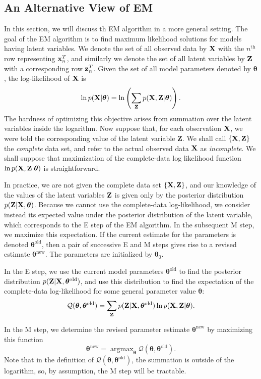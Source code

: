 \documentclass[../book-template.tex]{subfiles}
\begin{document}
\subsection{An Alternative View of EM}\label{sec_4_em_km_compare}
In this section, we will discuss th EM algorithm in a more general setting. The goal of the EM algorithm is to find maximum likelihood solutions for models having latent variables. We denote the set of all observed data by ${\bf X}$ with the $n^{\text{th}}$ row representing ${\bf x}_n^T$, and similarly we denote the set of all latent variables by ${\bf Z}$ with a corresponding row ${\bf z}_n^T$. Given the set of all model parameters denoted by $\bm{\theta}$, the log-likelihood of ${\bf X}$ is
\begin{equation*}
	\ln p({\bf X}|\bm{\theta}) = \ln \left(\sum_{\bf Z} p({\bf X,Z}|\bm{\theta}) \right).
\end{equation*}
The hardness of optimizing this objective arises from summation over the latent variables inside the logarithm. Now suppose that, for each observation ${\bf X}$, we were told the corresponding value of the latent variable {\bf Z}. We shall call $\{{\bf X, Z}\}$ the \emph{complete} data set, and refer to the actual observed data ${\bf X}$ as \emph{incomplete}. We shall suppose that maximization of the complete-data log likelihood function $\ln p({\bf X,Z}|\bm{\theta})$ is straightforward.
\par In practice, we are not given the complete data set $\{{\bf X, Z}\}$, and our knowledge of the values of the latent variables ${\bf Z}$ is given only by the posterior distribution $p({\bf Z}|{\bf X},\bm{\theta})$. Because we cannot use the complete-data log-likelihood, we consider instead its expected value under the posterior distribution of the latent variable, which corresponds to the E step of the EM algorithm. In the subsequent M step, we maximize this expectation. If the current estimate for the parameters is denoted $\bm{\theta}^{\text{old}}$, then a pair of successive E and M steps gives rise to a revised estimate $\bm{\theta}^{\text{new}}$. The parameters are initialized by $\bm{\theta}_0$.
\par In the E step, we use the current model parameters $\bm{\theta}^{\text{old}}$ to find the posterior distribution $p({\bf Z}|{\bf X},\bm{\theta}^{\text{old}})$, and use this distribution to find the expectation of the complete-data log-likelihood for some general parameter value $\bm{\theta}$:
\begin{equation*}
	\mathcal{Q}(\bm{\theta}, \bm{\theta}^{\text{old}}) = \sum_{\bf Z} p({\bf Z}|{\bf X},\bm{\theta}^{\text{old}}) \ln p({\bf X, Z}|\bm{\theta}).
\end{equation*}
\par In the M step, we determine the revised parameter estimate $\bm{\theta}^{\text{new}}$ by maximizing this function
\begin{equation*}
	 \bm{\theta}^{\text{new}} = \mathop{\arg\max}_{\bm{\theta}} 	\mathcal{Q}(\bm{\theta}, \bm{\theta}^{\text{old}}).
\end{equation*}
Note that in the definition of $\mathcal{Q}(\bm{\theta}, \bm{\theta}^{\text{old}})$, the summation is outside of the logarithm, so, by assumption, the M step will be tractable.
\end{document}
